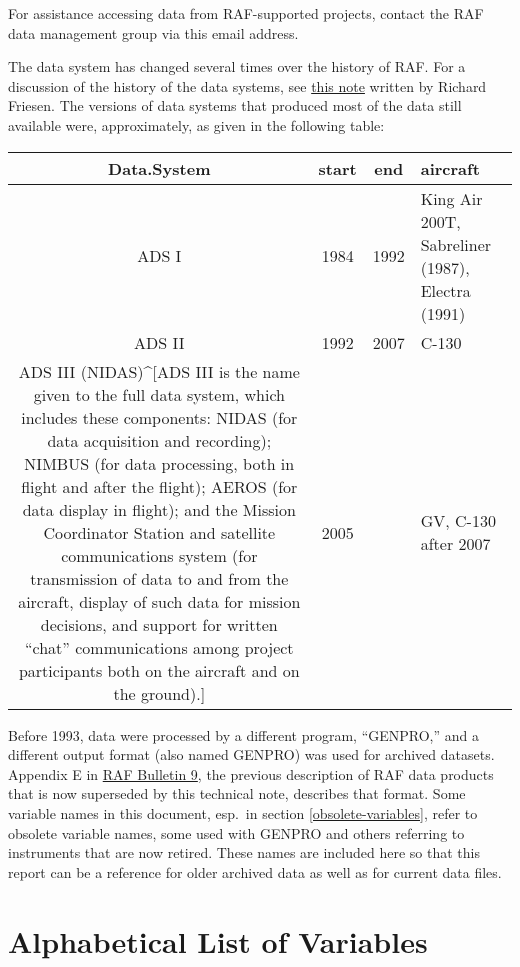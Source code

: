 \documentclass[
]{book}
\begin{document}
For assistance accessing data from RAF-supported projects, contact the RAF data management group via this email address.

The data system has changed several times over the history of RAF. For a discussion of the history of the data systems, see \href{www/ADSHistory.pdf}{this note} written by Richard Friesen. The versions of data systems that produced most of the data still available were, approximately, as given in the following table:

\begin{table}
\centering
\begin{tabular}{c|c|c|l}
\hline
Data.System & start & end & aircraft\\
\hline
ADS I & 1984 & 1992 & King Air 200T, Sabreliner (1987), Electra (1991)\\
\hline
ADS II & 1992 & 2007 & C-130\\
\hline
ADS III (NIDAS)\textasciicircum{}[ADS III is the name given to the full data system, which includes these components: NIDAS (for data acquisition and recording); NIMBUS (for data processing, both in flight and after the flight); AEROS (for data display in flight); and the Mission Coordinator Station and satellite communications system (for transmission of data to and from the aircraft, display of such data for mission decisions, and support for written “chat” communications among project participants both on the aircraft and on the ground).] & 2005 &  & GV, C-130 after 2007\\
\hline
\end{tabular}
\end{table}

Before 1993, data were processed by a different program, ``GENPRO,'' and a different output format (also named GENPRO) was used for archived datasets. Appendix E in \href{https://opensky.ucar.edu/islandora/object/archives\%3A8729}{RAF Bulletin 9}, the previous description of RAF data products that is now superseded by this technical note, describes that format. Some variable names in this document, esp.~in section \ref{obsolete-variables}, refer to obsolete variable names, some used with GENPRO and others referring to instruments that are now retired. These names are included here so that this report can be a reference for older archived data as well as for current data files.

\hypertarget{alphabetical-list-of-variables}{%
\section{Alphabetical List of Variables}\label{alphabetical-list-of-variables}}
\end{document}
